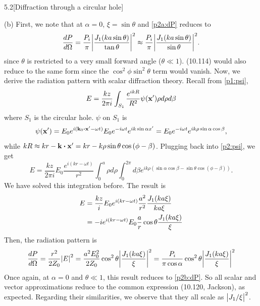 \documentclass[12pt]{article}
\begin{document}
\begin{problem}{5.2}[Diffraction through a circular hole]
\begin{solution}
(b) First, we note that at $\alpha=0$, $\xi=\sin\theta$ and \eqref{p2a:dP} 
reduces to
\begin{equation}\label{p2b:dP}
    \frac{dP}{d\Omega}
    =\frac{P_i}{\pi}\abs{\frac{J_1(ka\sin\theta)}{\tan\theta}}^2
    \approx\frac{P_i}{\pi}\abs{\frac{J_1(ka\sin\theta)}{\sin\theta}}^2.
\end{equation}
since $\theta$ is restricted to a very small forward angle ($\theta\ll 1$).
(10.114) would also reduce to the same form since the 
$\cos^2\phi\sin^2\theta$ term would vanish. Now, we derive the radiation 
pattern with scalar diffraction theory. Recall from \eqref{p1:psi},
\begin{equation}\label{p2:psi}
    E=\frac{kz}{2\pi i}\int_{S_1}\frac{e^{ikR}}{R^2}\psi(\vb{x}')\rho d\rho
    d\beta 
\end{equation}
where $S_1$ is the circular hole. $\psi$ on $S_1$ is
\begin{equation}
    \psi(\vb{x}')=E_0 e^{i(\vb{k}_0\vdot\vb{x}'-\omega t)}
    E_0e^{-i\omega t}e^{ik\sin\alpha x'}
    =E_0e^{-i\omega t}e^{ik\rho\sin\alpha\cos\beta},
\end{equation}
while $kR\approx kr-\vb{k}\vdot\vb{x}'=kr-k\rho\sin\theta\cos\qty(\phi-\beta)$.
Plugging back into \eqref{p2:psi}, we get
\begin{equation}
    E=\frac{kz}{2\pi i}E_0\frac{e^{i(kr-\omega t)}}{r^2}\int_0^a\rho
    d\rho\int_0^{2\pi}d\beta
    e^{ik\rho(\sin\alpha\cos\beta-\sin\theta\cos(\phi-\beta))}.
\end{equation}
We have solved this integration before. The result is
\begin{align}
    E
    &=\frac{kz}{i}E_0e^{i(kr-\omega t)}\frac{a^2}{r^2}\frac{J_1(ka\xi)}{ka\xi}
    \notag\\
    &=-ie^{i(kr-\omega t)}E_0\frac{a}{r}\cos\theta\frac{J_1(ka\xi)}{\xi}
\end{align}
Then, the radiation pattern is
\begin{equation}
    \frac{dP}{d\Omega}
    =\frac{r^2}{2Z_0}\abs{E}^2
    =\frac{a^2E_0^2}{2Z_0}\cos^2\theta\abs{\frac{J_1(ka\xi)}{\xi}}^2
    =\frac{P_i}{\pi\cos\alpha}\cos^2\theta\abs{\frac{J_1(ka\xi)}{\xi}}^2
\end{equation}
Once again, at $\alpha=0$ and $\theta\ll 1$, this result reduces to
\eqref{p2b:dP}. So all scalar and vector approximations reduce to the common
expression (10.120, Jackson), as expected. Regarding their similarities, we
observe that they all scale as $\abs{J_1/\xi}^2$.
\end{solution}
\end{problem}
\newpage
\end{document}
